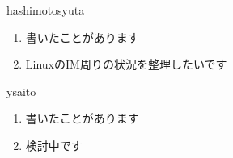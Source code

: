 \begin{prework}{ hashimotosyuta }
  \begin{enumerate}
  \item 書いたことがあります
  \item LinuxのIM周りの状況を整理したいです
  \end{enumerate}
\end{prework}

\begin{prework}{ ysaito }
  \begin{enumerate}
  \item 書いたことがあります
  \item 検討中です
  \end{enumerate}
\end{prework}
